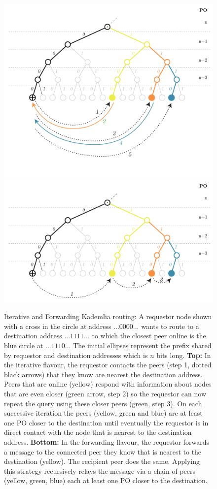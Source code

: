\begin{figure}[htbp]
   \centering
   \vspace{-2cm} 
   \includegraphics[width=.8\textwidth]{fig/iterative-kademlia.pdf}\\\vspace{-1.3cm}
   \includegraphics[width=.8\textwidth]{fig/forwarding-kademlia-3.pdf}
   \caption[Iterative and Forwarding Kademlia routing \statusgreen]{Iterative and Forwarding Kademlia routing: A requestor node shown with a cross in the circle at address $...0000...$ wants to route to a destination address $...1111...$ to which the closest peer online is the blue circle at $...1110...$ The initial ellipses represent the prefix shared by requestor and destination addresses which is $n$ bits long. \textbf{Top:} In the iterative flavour, the requestor contacts the peers (step 1, dotted black arrows) that they know are nearest the destination address. Peers that are online (yellow) respond with information about nodes that are even closer (green arrow, step 2) so the requestor can now repeat the query using these closer peers (green, step 3). On each successive iteration the peers (yellow, green and blue) are at least one PO closer to the destination until eventually the requestor is in direct contact with the node that is nearest to the destination address. \textbf{Bottom:} In the forwarding flavour, the requestor forwards a message to the connected peer they know that is nearest to the destination (yellow). The recipient peer does the same. Applying this strategy recursively relays the message via a chain of peers (yellow, green, blue) each at least one PO closer to the destination.}
   \label{fig:iterative-forwarding-kademlia}
\end{figure}


